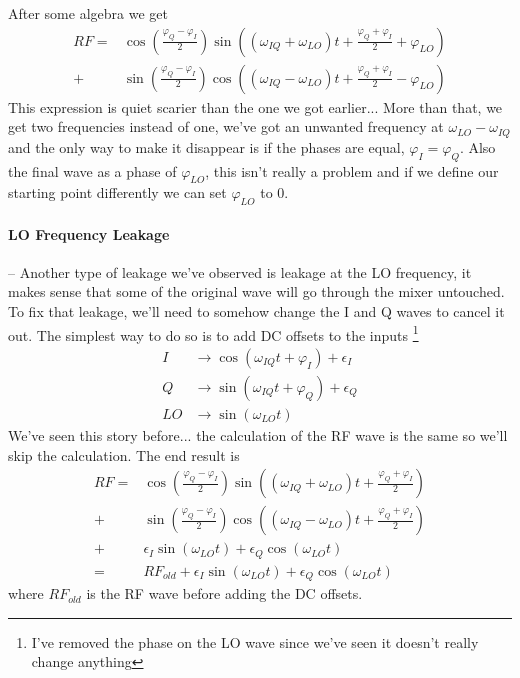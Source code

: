 After some algebra we get
\begin{align*}
RF = &\cos (\frac{\varphi_Q - \varphi_I}{2})\sin ( (\omega_{IQ} + \omega_{LO})t + \frac{\varphi_Q + \varphi_I}{2} + \varphi_{LO}) \\
   + &\sin (\frac{\varphi_Q - \varphi_I}{2})\cos ( (\omega_{IQ} - \omega_{LO})t + \frac{\varphi_Q + \varphi_I}{2} - \varphi_{LO})
\end{align*}
This expression is quiet scarier than the one we got earlier... More than that, we get two frequencies instead of one, we've got an unwanted frequency at $\omega_{LO} - \omega_{IQ}$ and the only way to make it disappear is if the phases are equal, $\varphi_I = \varphi_Q$. Also the final wave as a phase of $\varphi_{LO}$, this isn't really a problem and if we define our starting point differently we can set  $\varphi_{LO}$ to 0.

\paragraph*{LO Frequency Leakage}--\quad
Another type of leakage we've observed is leakage at the LO frequency, it makes sense that some of the original wave will go through the mixer untouched. To fix that leakage, we'll need to somehow change the I and Q waves to cancel it out. The simplest way to do so is to add DC offsets to the inputs \footnote{I've removed the phase on the LO wave since we've seen it doesn't really change anything}
\begin{align*}
    I &\longrightarrow \cos (\omega_{IQ} t + \varphi_I) + \epsilon_I\\
    Q &\longrightarrow \sin (\omega_{IQ} t + \varphi_Q) + \epsilon_Q\\
    LO &\longrightarrow \sin (\omega_{LO}t)
\end{align*}
We've seen this story before... the calculation of the RF wave is the same so we'll skip the calculation. The end result is
\begin{align*}
RF = &\cos (\frac{\varphi_Q - \varphi_I}{2})\sin ( (\omega_{IQ} + \omega_{LO})t + \frac{\varphi_Q + \varphi_I}{2}) \\
   + &\sin (\frac{\varphi_Q - \varphi_I}{2})\cos ( (\omega_{IQ} - \omega_{LO})t + \frac{\varphi_Q + \varphi_I}{2}) \\
   + &\epsilon_I  \sin (\omega_{LO}t) + \epsilon_Q  \cos (\omega_{LO}t) \\
   = &RF_{old} + \epsilon_I  \sin (\omega_{LO}t) + \epsilon_Q  \cos (\omega_{LO}t)
\end{align*}
where $RF_{old}$ is the RF wave before adding the DC offsets. 

